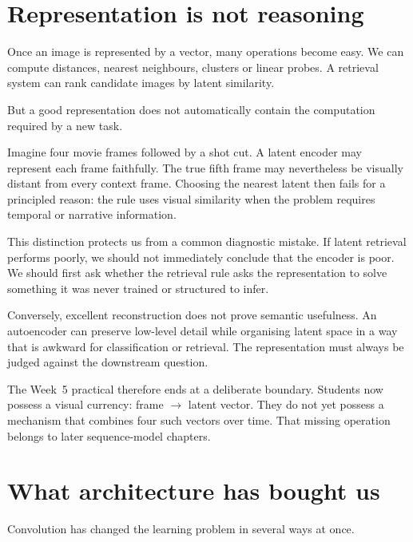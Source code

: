 \section{Representation is not reasoning}

Once an image is represented by a vector, many operations become easy. We can compute distances, nearest neighbours, clusters or linear probes. A retrieval system can rank candidate images by latent similarity.

But a good representation does not automatically contain the computation required by a new task.

Imagine four movie frames followed by a shot cut. A latent encoder may represent each frame faithfully. The true fifth frame may nevertheless be visually distant from every context frame. Choosing the nearest latent then fails for a principled reason: the rule uses visual similarity when the problem requires temporal or narrative information.

This distinction protects us from a common diagnostic mistake. If latent retrieval performs poorly, we should not immediately conclude that the encoder is poor. We should first ask whether the retrieval rule asks the representation to solve something it was never trained or structured to infer.

Conversely, excellent reconstruction does not prove semantic usefulness. An autoencoder can preserve low-level detail while organising latent space in a way that is awkward for classification or retrieval. The representation must always be judged against the downstream question.

The Week~5 practical therefore ends at a deliberate boundary. Students now possess a visual currency: frame \(\rightarrow\) latent vector. They do not yet possess a mechanism that combines four such vectors over time. That missing operation belongs to later sequence-model chapters.

\section{What architecture has bought us}

Convolution has changed the learning problem in several ways at once.

